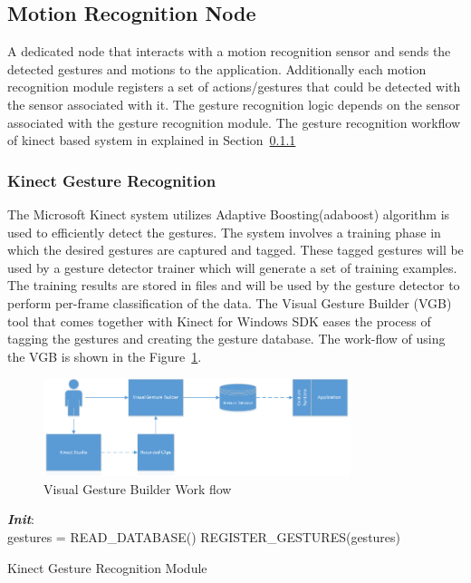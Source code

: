 \subsection{Motion Recognition Node} A dedicated node that interacts with a motion recognition sensor and sends the detected gestures and motions to the application. Additionally each motion recognition module registers a set of actions/gestures that could be detected with the sensor associated with it. The gesture recognition logic depends on the sensor associated with the gesture recognition module. The gesture recognition workflow of kinect based system in explained in Section~\ref{sssec:kinect_gestures}
\subsubsection{Kinect Gesture Recognition}
\label{sssec:kinect_gestures}
	The Microsoft Kinect system utilizes Adaptive Boosting(adaboost) algorithm \cite{freund1997decision} is used to efficiently detect the gestures. The system involves a training phase in which the desired gestures are captured and tagged. These tagged gestures will be used by a gesture detector trainer which will generate a set of training examples. The training results are stored in files and will be used by the gesture detector to perform per-frame classification of the data. The Visual Gesture Builder (VGB) tool that comes together with Kinect for Windows SDK eases the process of tagging the gestures and creating the gesture database. The work-flow of using the VGB is shown in the Figure~\ref{fig:vgb_workflow}.
\begin{figure}
\centering
\includegraphics[width=0.8\textwidth]{assets/VisualGestureBuilder.png}
\caption[Visual Gesture Builder Work flow]{Visual Gesture Builder Work flow \cite{KinectSDK2014}}
\label{fig:vgb_workflow}
\end{figure}
\begin{algorithm}
 \textbf{\emph{Init}}:\\
 \quad gestures = READ\_DATABASE()\;
 \quad REGISTER\_GESTURES(gestures)\;
 \caption{Kinect Gesture Recognition Module}
 \label{alg:localize}
\end{algorithm}
